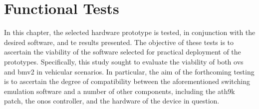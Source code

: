 \chapter{Functional Tests}
\label{cha:software_tests}

In this chapter, the selected hardware prototype is tested, in conjunction with the desired software, and te results presented. The objective of these tests is to ascertain the viability of the software selected for practical deployment of the prototypes. Specifically, this study sought to evaluate the viability of both \gls{ovs} and \gls{bmv2} in vehicular scenarios. In particular, the aim of the forthcoming testing is to ascertain the degree of compatibility between the aforementioned switching emulation software and a number of other components, including the ath9k patch, the \gls{onos} controller, and the hardware of the device in question.


